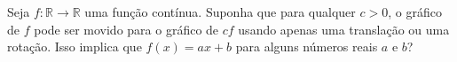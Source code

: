 Seja \( f \colon  \mathbb{R}\to \mathbb{R}\) uma função contínua. Suponha que para qualquer \( c > 0\), o gráfico de \( f\) pode ser movido para o gráfico de \( cf\) usando apenas uma translação ou uma rotação. Isso implica que \( f(x) = ax+b\) para alguns números reais \( a\) e \( b\)?
